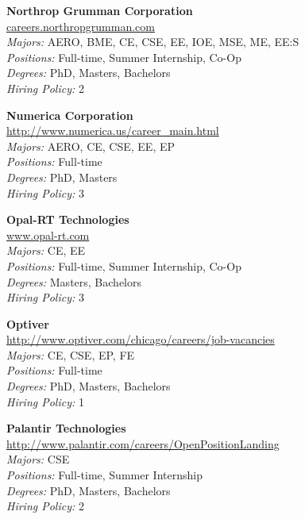\documentclass[twoside]{article}
\begin{document}
\begin{center}
\begin{multicols}{3}
\begin{minipage}{.9\columnwidth}{\Large\bf Northrop Grumman Corporation }\\
	\url{careers.northropgrumman.com}\\
	\emph{Majors:} AERO, BME, CE, CSE, EE, IOE, MSE, ME, EE:S\\
	\emph{Positions:} Full-time, Summer Internship, Co-Op\\
	\emph{Degrees:} PhD, Masters, Bachelors\\
	\emph{Hiring Policy:} 2\\
\end{minipage}
 
\begin{minipage}{.9\columnwidth}{\Large\bf Numerica Corporation }\\
	\url{http://www.numerica.us/career_main.html}\\
	\emph{Majors:} AERO, CE, CSE, EE, EP\\
	\emph{Positions:} Full-time\\
	\emph{Degrees:} PhD, Masters\\
	\emph{Hiring Policy:} 3\\
\end{minipage}
 
\begin{minipage}{.9\columnwidth}{\Large\bf Opal-RT Technologies }\\
	\url{www.opal-rt.com}\\
	\emph{Majors:} CE, EE\\
	\emph{Positions:} Full-time, Summer Internship, Co-Op\\
	\emph{Degrees:} Masters, Bachelors\\
	\emph{Hiring Policy:} 3\\
\end{minipage}
 
\begin{minipage}{.9\columnwidth}{\Large\bf Optiver }\\
	\url{http://www.optiver.com/chicago/careers/job-vacancies}\\
	\emph{Majors:} CE, CSE, EP, FE\\
	\emph{Positions:} Full-time\\
	\emph{Degrees:} PhD, Masters, Bachelors\\
	\emph{Hiring Policy:} 1\\
\end{minipage}
 
\begin{minipage}{.9\columnwidth}{\Large\bf Palantir Technologies }\\
	\url{http://www.palantir.com/careers/OpenPositionLanding}\\
	\emph{Majors:} CSE\\
	\emph{Positions:} Full-time, Summer Internship\\
	\emph{Degrees:} PhD, Masters, Bachelors\\
	\emph{Hiring Policy:} 2\\
\end{minipage}
 

\end{multicols}
\end{center}
\end{document}

